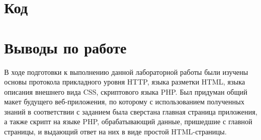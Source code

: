 \documentclass[a4paper, 12pt]{article}
\begin{document}
\newpage

\section{Код}





\section{Выводы по работе}
В ходе подготовки к выполнению данной лабораторной работы были изучены основы протокола прикладного уровня HTTP, языка разметки HTML, языка описания внешнего вида CSS, скриптового языка PHP. Был придуман общий макет будущего веб-приложения, по которому с использованием полученных знаний в соответствии с заданием была сверстана главная страница приложения, а также скрипт на языке PHP, обрабатывающий данные, пришедшие с главной страницы, и выдающий ответ на них в виде простой HTML-страницы.
\end{document}
